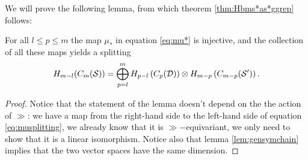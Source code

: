 We will prove the following lemma, from which theorem \ref{thm:Hbms*as*ggrep} follows:
\begin{lem}
 \label{lem:oplussplitting}
For all $l\leq p\leq m$ the map $\mu_*$ in equation \ref{eq:mu*} is injective, and the collection
of all these maps yields a splitting
\begin{equation}
  \label{eq:musplitting}
 H_{m-l}(C_m(\mathcal{S}))=\bigoplus_{p=l}^m H_{p-l}\left(C_p(\mathcal{D})\right)\otimes H_{m-p}\left(C_{m-p}(\mathcal{S}')\right).
\end{equation}
\end{lem}
\begin{proof}
Notice that the statement of the lemma doesn't depend on the the action of $\gg$:
we have a map from the right-hand side to the left-hand side of equation \ref{eq:musplitting},
we already know that it is $\gg-$equivariant,
we only need to show that it is a linear isomorphism. Notice also that lemma \ref{lem:gensymchain}
implies that the two vector spaces have the same dimension.
% 
% 
% 


\end{proof}
